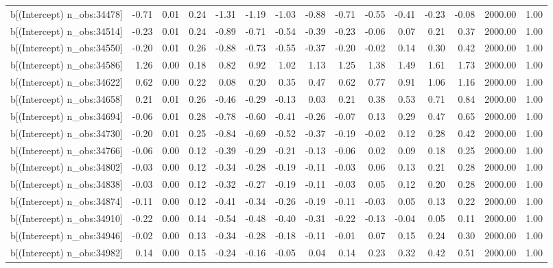 \begin{table}[ht]
\begin{tabular}{rrrrrrrrrrrrrrr}
  b[(Intercept) n\_obs:34478] & -0.71 & 0.01 & 0.24 & -1.31 & -1.19 & -1.03 & -0.88 & -0.71 & -0.55 & -0.41 & -0.23 & -0.08 & 2000.00 & 1.00 \\ 
  b[(Intercept) n\_obs:34514] & -0.23 & 0.01 & 0.24 & -0.89 & -0.71 & -0.54 & -0.39 & -0.23 & -0.06 & 0.07 & 0.21 & 0.37 & 2000.00 & 1.00 \\ 
  b[(Intercept) n\_obs:34550] & -0.20 & 0.01 & 0.26 & -0.88 & -0.73 & -0.55 & -0.37 & -0.20 & -0.02 & 0.14 & 0.30 & 0.42 & 2000.00 & 1.00 \\ 
  b[(Intercept) n\_obs:34586] & 1.26 & 0.00 & 0.18 & 0.82 & 0.92 & 1.02 & 1.13 & 1.25 & 1.38 & 1.49 & 1.61 & 1.73 & 2000.00 & 1.00 \\ 
  b[(Intercept) n\_obs:34622] & 0.62 & 0.00 & 0.22 & 0.08 & 0.20 & 0.35 & 0.47 & 0.62 & 0.77 & 0.91 & 1.06 & 1.16 & 2000.00 & 1.00 \\ 
  b[(Intercept) n\_obs:34658] & 0.21 & 0.01 & 0.26 & -0.46 & -0.29 & -0.13 & 0.03 & 0.21 & 0.38 & 0.53 & 0.71 & 0.84 & 2000.00 & 1.00 \\ 
  b[(Intercept) n\_obs:34694] & -0.06 & 0.01 & 0.28 & -0.78 & -0.60 & -0.41 & -0.26 & -0.07 & 0.13 & 0.29 & 0.47 & 0.65 & 2000.00 & 1.00 \\ 
  b[(Intercept) n\_obs:34730] & -0.20 & 0.01 & 0.25 & -0.84 & -0.69 & -0.52 & -0.37 & -0.19 & -0.02 & 0.12 & 0.28 & 0.42 & 2000.00 & 1.00 \\ 
  b[(Intercept) n\_obs:34766] & -0.06 & 0.00 & 0.12 & -0.39 & -0.29 & -0.21 & -0.13 & -0.06 & 0.02 & 0.09 & 0.18 & 0.25 & 2000.00 & 1.00 \\ 
  b[(Intercept) n\_obs:34802] & -0.03 & 0.00 & 0.12 & -0.34 & -0.28 & -0.19 & -0.11 & -0.03 & 0.06 & 0.13 & 0.21 & 0.28 & 2000.00 & 1.00 \\ 
  b[(Intercept) n\_obs:34838] & -0.03 & 0.00 & 0.12 & -0.32 & -0.27 & -0.19 & -0.11 & -0.03 & 0.05 & 0.12 & 0.20 & 0.28 & 2000.00 & 1.00 \\ 
  b[(Intercept) n\_obs:34874] & -0.11 & 0.00 & 0.12 & -0.41 & -0.34 & -0.26 & -0.19 & -0.11 & -0.03 & 0.05 & 0.13 & 0.22 & 2000.00 & 1.00 \\ 
  b[(Intercept) n\_obs:34910] & -0.22 & 0.00 & 0.14 & -0.54 & -0.48 & -0.40 & -0.31 & -0.22 & -0.13 & -0.04 & 0.05 & 0.11 & 2000.00 & 1.00 \\ 
  b[(Intercept) n\_obs:34946] & -0.02 & 0.00 & 0.13 & -0.34 & -0.28 & -0.18 & -0.11 & -0.01 & 0.07 & 0.15 & 0.24 & 0.30 & 2000.00 & 1.00 \\ 
  b[(Intercept) n\_obs:34982] & 0.14 & 0.00 & 0.15 & -0.24 & -0.16 & -0.05 & 0.04 & 0.14 & 0.23 & 0.32 & 0.42 & 0.51 & 2000.00 & 1.00 \\ 

\end{tabular}
\end{table}
